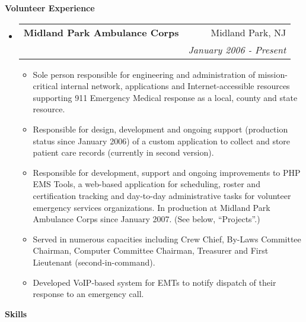 \documentclass[letterpaper,11pt]{article}
\makeatletter
\newcommand{\resitem}[1]{\item #1 \vspace{-2pt}}
\newcommand{\resheading}[1]{{\large \colorbox{mygrey}{\begin{minipage}{\textwidth}{\textbf{#1 \vphantom{p\^{E}}}}\end{minipage}}}}
\newcommand{\ressubheading}[4]{
\begin{tabular*}{7.0in}{l@{\extracolsep{\fill}}r}
		\textbf{#1} & #2 \\
		\textit{#3} & \textit{#4} \\
\end{tabular*}\vspace{-6pt}}
\makeatother
\begin{document}
\resheading{Volunteer Experience}
\begin{itemize}
\item
        \ressubheading{Midland Park Ambulance Corps}{Midland Park, NJ}{}{January 2006 - Present}
        \begin{itemize}
                \resitem{Sole person responsible for engineering and administration of
                  mission-critical internal network, applications and
                  Internet-accessible resources supporting 911 Emergency
                  Medical response as a local, county and state resource.}
                \resitem{Responsible for design, development and ongoing support (production
                  status since January 2006) of a custom application to
                  collect and store patient care records (currently in second version).}
                \resitem{Responsible for development, support and ongoing
                  improvements to PHP EMS Tools, a web-based application for
                  scheduling, roster and certification tracking and day-to-day
                administrative tasks for volunteer emergency services
                organizations. In production at Midland Park Ambulance Corps
                since January 2007. (See below, ``Projects''.)}
                \resitem{Served in numerous capacities including Crew Chief,
                  By-Laws Committee Chairman, Computer Committee Chairman,
                  Treasurer and First Lieutenant (second-in-command).}
                \resitem{Developed VoIP-based system for EMTs to notify
                  dispatch of their response to an emergency call.}
        \end{itemize}
\end{itemize}

\resheading{Skills}
\end{document}
